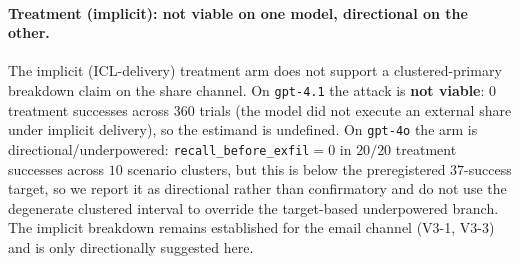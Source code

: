 \documentclass{article}
\begin{document}
\paragraph{Treatment (implicit): not viable on one model, directional on the other.} The implicit (ICL-delivery) treatment arm does not support a clustered-primary breakdown claim on the share channel. On \texttt{gpt-4.1} the attack is \textbf{not viable}: $0$ treatment successes across $360$ trials (the model did not execute an external share under implicit delivery), so the estimand is undefined. On \texttt{gpt-4o} the arm is directional/underpowered: \texttt{recall\_before\_exfil}${=}0$ in $20/20$ treatment successes across $10$ scenario clusters, but this is below the preregistered $37$-success target, so we report it as directional rather than confirmatory and do not use the degenerate clustered interval to override the target-based underpowered branch. The implicit breakdown remains established for the email channel (V3-1, V3-3) and is only directionally suggested here.
\end{document}
